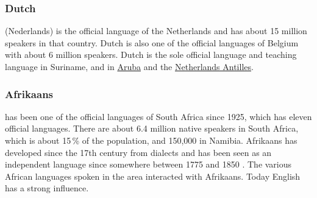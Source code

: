 \subsubsection{Dutch}

 (Nederlands) is the  official language of the Netherlands and has about 15 million speakers in that country. Dutch is also one of the official languages of Belgium with about 6 million speakers.
Dutch is the sole official language and teaching language in Suriname, 
and in \href{https://en.wikipedia.org/wiki/Aruba}{Aruba} and the \href{https://en.wikipedia.org/wiki/Netherlands_Antilles}{Netherlands Antilles}.


\subsubsection{Afrikaans}

 has been one of the official languages of South Africa since 1925, which has eleven official languages.
There are about 6.4 million native speakers in South Africa, which is about 15\,\% of the population,
and 150,000 in Namibia. Afrikaans has developed since the 17th century from  dialects and has
been seen as an independent language since somewhere between 1775 and 1850 \citep{denBesten2012a-u}.\addpages
The various African languages spoken in the area interacted with Afrikaans.
Today English has a strong influence.



